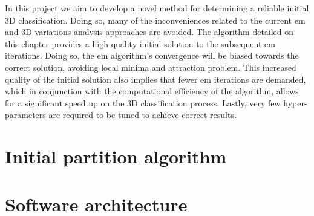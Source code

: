 \documentclass[../main.tex]{subfiles}
\begin{document}
In this project we aim to develop a novel method for determining a reliable initial 3D classification. Doing so, many of the inconveniences related to the current \gls{em} and 3D variations analysis approaches are avoided. The algorithm detailed on this chapter provides a high quality initial solution to the subsequent \gls{em} iterations. Doing so, the \gls{em} algorithm's convergence will be biased towards the correct solution, avoiding local minima and attraction problem. This increased quality of the initial solution also implies that fewer \gls{em} iterations are demanded, which in conjunction with the computational efficiency of the algorithm, allows for a significant speed up on the 3D classification process. Lastly, very few hyper-parameters are required to be tuned to achieve correct results.

\section{Initial partition algorithm}


\section{Software architecture}

\end{document}

